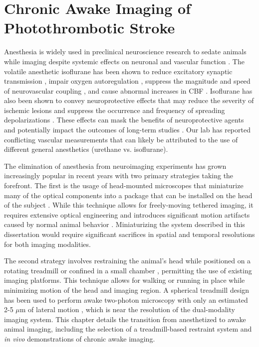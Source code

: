 
\chapter{Chronic Awake Imaging of Photothrombotic Stroke} \label{ch:awake}

Anesthesia is widely used in preclinical neuroscience research to sedate animals while imaging despite systemic effects on neuronal and vascular function \cite{Janssen:2004ih}. The volatile anesthetic isoflurane has been shown to reduce excitatory synaptic transmission \cite{BergJohnsen:1992wk}, impair oxygen autoregulation \cite{Aksenov:2012wh}, suppress the magnitude and speed of neurovascular coupling \cite{Pisauro:2013cx}, and cause abnormal increases in CBF \cite{Strebel:1995uh, Iida:1998th}. Isoflurane has also been shown to convey neuroprotective effects that may reduce the severity of ischemic lesions \cite{Sakai:2007wc, Burchell:2013tj} and suppress the occurrence and frequency of spreading depolarizations \cite{Kudo:2016ho}. These effects can mask the benefits of neuroprotective agents and potentially impact the outcomes of long-term studies \cite{Kapinya:ua, Seto:2014ga}. Our lab has reported \cite{Ponticorvo:2010uv, Kazmi:2013ey, Sullender:2018ff} conflicting vascular  measurements that can likely be attributed to the use of different general anesthetics (urethane vs. isoflurane).

The elimination of anesthesia from neuroimaging experiments has grown increasingly popular in recent years with two primary strategies taking the forefront. The first is the usage of head-mounted microscopes that miniaturize many of the optical components into a package that can be installed on the head of the subject \cite{Gu:1999ky, Helmchen:2001tw, Flusberg:2005tq}. While this technique allows for freely-moving tethered imaging, it requires extensive optical engineering and introduces significant motion artifacts caused by normal animal behavior \cite{Helmchen:2001tw}. Miniaturizing the system described in this dissertation would require significant sacrifices in spatial and temporal resolutions for both imaging modalities.

The second strategy involves restraining the animal's head while positioned on a rotating treadmill \cite{Pisauro:2013cx, Dombeck:2007gr, Wienisch:2011ju, Kaifosh:2013fy, Heiney:2018gq} or confined in a small chamber \cite{Silasi:2016dq}, permitting the use of existing imaging platforms. This technique allows for walking or running in place while minimizing motion of the head and imaging region. A spherical treadmill design has been used to perform awake two-photon microscopy with only an estimated 2-5 $\mu$m of lateral motion \cite{Dombeck:2007gr}, which is near the resolution of the dual-modality imaging system. This chapter details the transition from anesthetized to awake animal imaging, including the selection of a treadmill-based restraint system and \textit{in vivo} demonstrations of chronic awake imaging.



